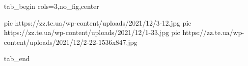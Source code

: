  
 
 
 
 


\ifcmt
  tab_begin cols=3,no_fig,center

     pic https://zz.te.ua/wp-content/uploads/2021/12/3-12.jpg
		 pic https://zz.te.ua/wp-content/uploads/2021/12/1-33.jpg
		 pic https://zz.te.ua/wp-content/uploads/2021/12/2-22-1536x847.jpg

  tab_end
\fi
